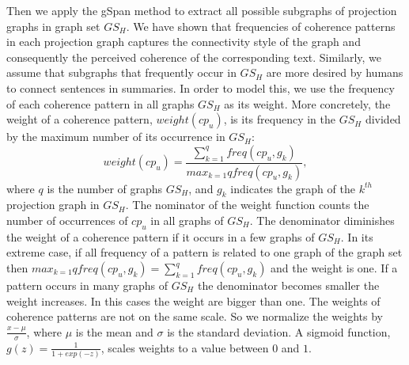 Then we apply the gSpan method to extract all possible subgraphs of projection graphs in graph set $GS_H$. 
We have shown that frequencies of coherence patterns in each projection graph captures the connectivity style of the graph and consequently the perceived coherence of the corresponding text. 
Similarly, we assume that subgraphs that frequently occur in $GS_H$ are more desired by humans to connect sentences in summaries. 
In order to model this, we use the frequency of each coherence pattern in all graphs $GS_H$ as its weight.  
More concretely, the weight of a coherence pattern, $weight(cp_u)$, is its frequency in the $GS_H$ divided by the maximum number of its occurrence in $GS_H$:
\begin{equation}
weight(cp_u) = \frac{\sum_{k=1}^{q}{freq(cp_u,g_k)}}{max_{k=1}{q}{freq(cp_u,g_k)}},
\end{equation}
%
where $q$ is the number of graphs $GS_H$, and $g_k$ indicates the graph of the $k^{th}$ projection graph in $GS_H$.
The nominator of the weight function counts the number of occurrences of $cp_u$ in all graphs of $GS_H$. 
The denominator diminishes the weight of a coherence pattern if it  occurs in a few graphs of $GS_H$. 
In its extreme case, if all frequency of a pattern is related to one graph of the graph set then $max_{k=1}{q}{freq(cp_u,g_k)}=\sum_{k=1}^{q}{freq(cp_u,g_k)}$ and the weight is one. 
If a pattern occurs in many graphs of $GS_H$ the denominator becomes smaller the weight increases. 
In this cases the weight are bigger than one. 
The weights of coherence patterns are not on the same scale.  
So we normalize the weights by $\frac{x-\mu}{\sigma}$, where $\mu$ is the mean and $\sigma$ is the standard deviation.  
A sigmoid function, $g(z) = \frac{1}{1+exp(-z)}$, scales weights to a value between $0$ and $1$. 


